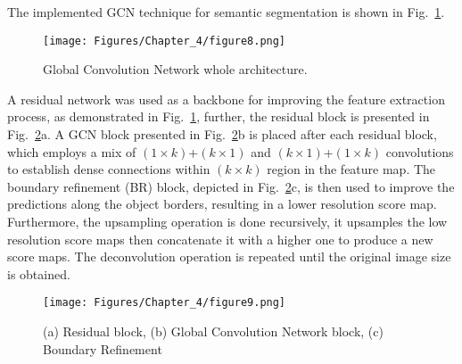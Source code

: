 The implemented GCN technique for semantic segmentation is shown in Fig.~\ref{fig:gcn}.
\begin{figure} [h!]
	\begin{center}
		\texttt{[image: Figures/Chapter\_4/figure8.png]}
	\end{center}
	\caption{Global Convolution Network whole architecture.} 
	\label{fig:gcn}
\end{figure}

A residual network was used as a backbone for improving the feature extraction process, as demonstrated in Fig.~\ref{fig:gcn}, further, the residual block is presented in Fig.~\ref{fig:res_gcn_br}a.
A GCN block presented in Fig.~\ref{fig:res_gcn_br}b is placed after each residual block, which employs a mix of \((1\times k)\)+\((k\times 1)\) and \((k\times 1)\)+\((1\times k)\) convolutions to establish dense connections within \((k\times k)\) region in the feature map.
The boundary refinement (BR) block, depicted in Fig.~\ref{fig:res_gcn_br}c, is then used to improve the predictions along the object borders, resulting in a lower resolution score map.
Furthermore, the upsampling operation is done recursively, it upsamples the low 
resolution score maps then concatenate it with a higher one to produce a new 
score maps.
The deconvolution operation is repeated until the original image size is 
obtained.
\begin{figure} [h!]
	\begin{center}
		\texttt{[image: Figures/Chapter\_4/figure9.png]}
	\end{center}
	\caption{(a) Residual block, (b) Global Convolution Network block, (c) 
		Boundary Refinement} 
	\label{fig:res_gcn_br}
\end{figure}